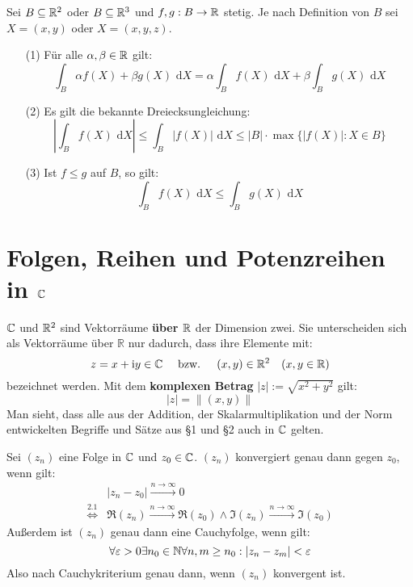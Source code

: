 \documentclass[a4paper,twoside,DIV15,BCOR12mm,chapterprefix=true,headings=twolinechapter]{scrbook}
\begin{document}
\begin{enumerate}
\begin{satz}
Sei $B\subseteq\mathbb{R}^2$ oder $B\subseteq\mathbb{R}^3$ und $f,g:B\to\mathbb{R}$ stetig.
Je nach Definition von $B$ sei $X=(x,y)$ oder $X=(x,y,z)$.
\begin{enumerate}
\item[(1)] Für alle $\alpha,\beta\in\mathbb{R}$ gilt:
\[\int_B \alpha f(X)+\beta g(X)\text{ d}X=\alpha\int_B f(X)\text{ d}X+\beta\int_B g(X)\text{ d}X\]
\item[(2)] Es gilt die bekannte Dreiecksungleichung:
\[\left|\int_B f(X)\text{ d}X\right|\le \int_B |f(X)| \text{ d}X\le |B|\cdot \max\{|f(X)|: X\in B\}\]
\item[(3)] Ist $f\le g$ auf $B$, so gilt:
\[\int_B f(X)\text{ d}X \le \int_B g(X)\text{ d}X\]
\end{enumerate}
\end{satz}
\end{enumerate}

\chapter{Folgen, Reihen und Potenzreihen in $\mathbb{C}$}
\renewcommand{\labelenumi}{(\arabic{enumi})}

$\mathbb{C}$ und $\mathbb{R}^2$ sind Vektorräume \textbf{über $\mathbb{R}$} der Dimension zwei.
Sie unterscheiden sich als Vektorräume über $\mathbb{R}$ nur dadurch, dass ihre Elemente
mit:
\[z=x+\text{i} y\in \mathbb{C} \quad \text { bzw. }\quad (x,y)\in\mathbb{R}^2 \quad(x,y\in\mathbb{R})\]
bezeichnet werden. Mit dem \textbf{komplexen Betrag} $|z|:=\sqrt{x^2+y^2}$ gilt:
\[|z|=\|(x,y)\|\]
Man sieht, dass alle aus der Addition, der Skalarmultiplikation und der Norm entwickelten Begriffe
und Sätze aus §1 und §2 auch in $\mathbb{C}$ gelten.\\

\begin{beispiel}
Sei $(z_n)$ eine Folge in $\mathbb{C}$ und $z_0\in\mathbb{C}$. $(z_n)$ konvergiert genau dann gegen
$z_0$, wenn gilt:
\begin{align*}
&|z_n-z_0|\stackrel{n\to\infty}{\to}0\\
\stackrel{2.1}{\iff} &\Re(z_n)\stackrel{n\to\infty}{\to}\Re(z_0)\wedge
\Im(z_n)\stackrel{n\to\infty}{\to}\Im(z_0)
\end{align*}
Außerdem ist $(z_n)$ genau dann eine Cauchyfolge, wenn gilt:
\[\forall\varepsilon>0\exists n_0\in\mathbb{N}\forall n,m\ge n_0: |z_n-z_m|<\varepsilon\]
Also nach Cauchykriterium genau dann, wenn $(z_n)$ konvergent ist.
\end{beispiel}
\end{document}
